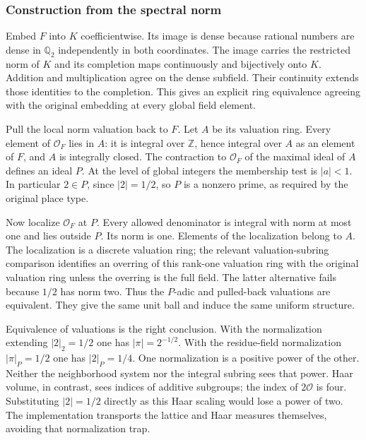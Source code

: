 \documentclass[12pt,letterpaper]{article}
\begin{document}
\subsubsection{Construction from the spectral norm}
Embed $F$ into $K$ coefficientwise. Its image is dense because rational numbers are dense in $\mathbb Q_2$ independently in both coordinates. The image carries the restricted norm of $K$ and its completion maps continuously and bijectively onto $K$. Addition and multiplication agree on the dense subfield. Their continuity extends those identities to the completion. This gives an explicit ring equivalence agreeing with the original embedding at every global field element.
\par
Pull the local norm valuation back to $F$. Let $A$ be its valuation ring. Every element of $\mathcal O_F$ lies in $A$: it is integral over $\mathbb Z$, hence integral over $A$ as an element of $F$, and $A$ is integrally closed. The contraction to $\mathcal O_F$ of the maximal ideal of $A$ defines an ideal $P$. At the level of global integers the membership test is $|a|<1$. In particular $2\in P$, since $|2|=1/2$, so $P$ is a nonzero prime, as required by the original place type.
\par
Now localize $\mathcal O_F$ at $P$. Every allowed denominator is integral with norm at most one and lies outside $P$. Its norm is one. Elements of the localization belong to $A$. The localization is a discrete valuation ring; the relevant valuation-subring comparison identifies an overring of this rank-one valuation ring with the original valuation ring unless the overring is the full field. The latter alternative fails because $1/2$ has norm two. Thus the $P$-adic and pulled-back valuations are equivalent. They give the same unit ball and induce the same uniform structure.
\par
Equivalence of valuations is the right conclusion. With the normalization extending $|2|_2=1/2$ one has $|\pi|=2^{-1/2}$. With the residue-field normalization $|\pi|_P=1/2$ one has $|2|_P=1/4$. One normalization is a positive power of the other. Neither the neighborhood system nor the integral subring sees that power. Haar volume, in contrast, sees indices of additive subgroups; the index of $2\mathcal O$ is four. Substituting $|2|=1/2$ directly as this Haar scaling would lose a power of two. The implementation transports the lattice and Haar measures themselves, avoiding that normalization trap.
\end{document}
